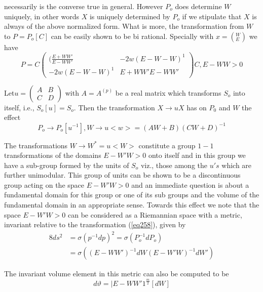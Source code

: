 necessarily is the converse true in general. However $P_o$ does
determine $W$ uniquely, in other words $X$ is uniquely determined by
$P_o$ if we stipulate that $X$ is always of the above normalized
form. What is more, the transformation from $W$ to $P = P_o [C]$ can
be easily shown to be bi rational. Specially with $x = (^W_E)$ we have  
\begin{equation*}
P = C 
 \left ( \begin{smallmatrix} ( \frac{E + WW'}{E - WW'} & - 2 w (E -
   W-W)^1 \\ - 2 w (E - W-W)^1 & {E + WW'}{E - WW'} \end{smallmatrix}
 \right ) C , E - WW > 0 \tag{257}\label{eq257} 
\end{equation*}

Let\pageoriginale $u = \left ( \begin{smallmatrix} A & B \\ C &
  D \end{smallmatrix} \right)$ with $A = A^{(p)}$ be a real matrix
which transforms $S_o$ into itself, i.e., $S_o [u] = S_o$. Then the
transformation $X\to u X$ has on $P_0$ and $W$ the effect   
\begin{equation*}
P_o \to P_o [ u^{-1} ], W \to u <w> = (AW + B)(CW +
D)^{-1}\tag{258}\label{eq258} 
\end{equation*}

The transformations $W \to W^* = u <W>$ constitute a group  $1 - 1$
transformations of the domains $E - W' W > 0$ onto itself and in this 
group we have a sub-group formed by the units of $S_o$ viz., those
among the $u's $ which are further unimodular. This group of units can
be shown to be a discontinuous group acting on the space $E - W' W >
  0$ and an immediate question is about a fundamental domain for this
  group or one of its sub groups and the volume of the fundamental
  domain in an appropriate sense. Towards this effect we note that the
  space $E - W'W > 0$ can be considered as a Riemannian space with a
  metric, invariant relative to the transformation (\ref{eq258}), given by  
\begin{align*}
8 ds^2 & = \sigma (p^{-1} d p)^2 = \sigma (P_o ^{-1} d P_o)\\
& = \sigma ((E - WW')^{-1} dW (E - W' W)^{-1} dW') \tag{259}\label{eq259}
\end{align*}

The invariant volume element in this metric can also be computed to be  
\begin{equation*}
d \vartheta = |E - WW' 1^{\frac{m}{2}} [dW] \tag{260}\label{eq260}
\end{equation*}

